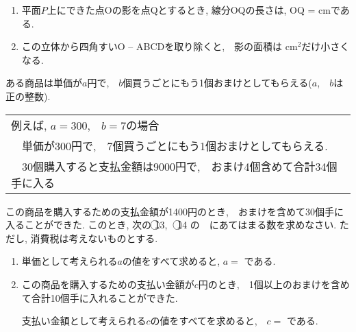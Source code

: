 \documentclass[dvipdfmx, titlepage, 11pt]{jsarticle}
\newcommand{\ncircle}[1]{\textcircled{\scriptsize #1}}
\newcommand{\nbox}[1]{\fbox{\hspace{5pt} \textcircled{\scriptsize #1}\hspace{5pt} }}
\newcommand{\ebox}{\fbox{　\hspace{10pt} }}
\begin{document}
\begin{enumerate}[(1)]
\item 平面$P$上にできた点Oの影を点Qとするとき, 線分OQの長さは, OQ = \nbox{11} cmである.\\[3cm]
\item この立体から四角すいO -- ABCDを取り除くと,\ \ 影の面積は \nbox{12} cm${}^{2}$だけ小さくなる.
\end{enumerate}

\newpage
\noindent {}\hspace{10pt} ある商品は単価が$a$円で,\ \ $b$個買うごとにもう1個おまけとしてもらえる($a$,\ \ $b$は正の整数).

\begin{center}
  \begin{tabular}{|l|} \hline
    例えば, $a=300$,\ \ $b=7$の場合\\
    　単価が300円で,\ \ 7個買うごとにもう1個おまけとしてもらえる.\\
    　30個購入すると支払金額は9000円で,\ \ おまけ4個含めて合計34個手に入る\\ \hline
  \end{tabular}
\end{center}
この商品を購入するための支払金額が1400円のとき,\ \ おまけを含めて30個手に入ることができた. このとき, 次の \ncircle{13},\ \ \ncircle{14} の\ \ebox \ にあてはまる数を求めなさい. ただし, 消費税は考えないものとする.

\begin{enumerate}[(1)]
\item 単価として考えられる$a$の値をすべて求めると, $a=$ \nbox{13} である.\\[5cm]
\item この商品を購入するための支払い金額が$c$円のとき,\ \ 1個以上のおまけを含めて合計10個手に入れることができた.

  支払い金額として考えられる$c$の値をすべてを求めると,\ \ $c=$ \nbox{14} である.
\end{enumerate}
\newpage
\thispagestyle{empty}
　
\newpage
\newpage
\thispagestyle{empty}
　
\newpage
\end{document}
